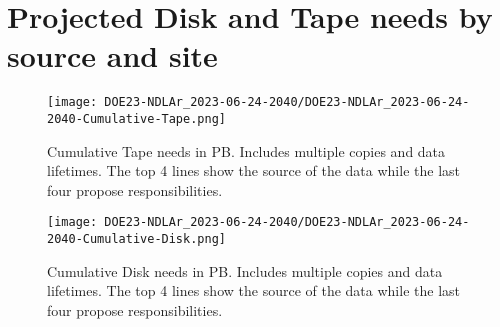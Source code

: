 \section{Projected Disk and Tape needs by source and site}
\begin{figure}[h]
\centering\texttt{[image: DOE23-NDLAr\_2023-06-24-2040/DOE23-NDLAr\_2023-06-24-2040-Cumulative-Tape.png]}
\caption{Cumulative Tape needs in PB. Includes multiple copies and data lifetimes. The top 4 lines show the source of the data while the last four propose responsibilities.}
\label{fig:Cumulative-Tape}
\end{figure}
\begin{figure}[h]
\centering\texttt{[image: DOE23-NDLAr\_2023-06-24-2040/DOE23-NDLAr\_2023-06-24-2040-Cumulative-Disk.png]}
\caption{Cumulative Disk needs in PB. Includes multiple copies and data lifetimes. The top 4 lines show the source of the data while the last four propose responsibilities.}
\label{fig:Cumulative-Disk}
\end{figure}
